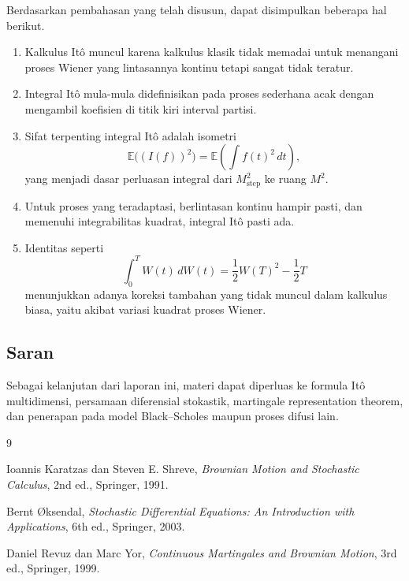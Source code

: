 \documentclass[12pt,a4paper]{article}
\theoremstyle{definition}
\theoremstyle{plain}
\newcommand{\E}{\mathbb{E}}
\begin{document}
Berdasarkan pembahasan yang telah disusun, dapat disimpulkan beberapa hal
berikut.
\begin{enumerate}[label=\arabic*.]
  \item Kalkulus It\^o muncul karena kalkulus klasik tidak memadai untuk
        menangani proses Wiener yang lintasannya kontinu tetapi sangat tidak
        teratur.
  \item Integral It\^o mula-mula didefinisikan pada proses sederhana acak dengan
        mengambil koefisien di titik kiri interval partisi.
  \item Sifat terpenting integral It\^o adalah isometri
        \[
          \E\bigl((I(f))^2\bigr)=\E\left(\int f(t)^2\,dt\right),
        \]
        yang menjadi dasar perluasan integral dari $M_{\mathrm{step}}^2$ ke
        ruang $M^2$.
  \item Untuk proses yang teradaptasi, berlintasan kontinu hampir pasti, dan
        memenuhi integrabilitas kuadrat, integral It\^o pasti ada.
  \item Identitas seperti
        \[
          \int_0^T W(t)\,dW(t)=\frac12W(T)^2-\frac12T
        \]
        menunjukkan adanya koreksi tambahan yang tidak muncul dalam kalkulus
        biasa, yaitu akibat variasi kuadrat proses Wiener.
\end{enumerate}

\subsection{Saran}

Sebagai kelanjutan dari laporan ini, materi dapat diperluas ke formula It\^o
multidimensi, persamaan diferensial stokastik, martingale representation
theorem, dan penerapan pada model Black--Scholes maupun proses difusi lain.

\begin{thebibliography}{9}

  Ioannis Karatzas dan Steven E. Shreve,
  \textit{Brownian Motion and Stochastic Calculus},
  2nd ed., Springer, 1991.

  Bernt {\O}ksendal,
  \textit{Stochastic Differential Equations: An Introduction with Applications},
  6th ed., Springer, 2003.

  Daniel Revuz dan Marc Yor,
  \textit{Continuous Martingales and Brownian Motion},
  3rd ed., Springer, 1999.

\end{thebibliography}
\end{document}
